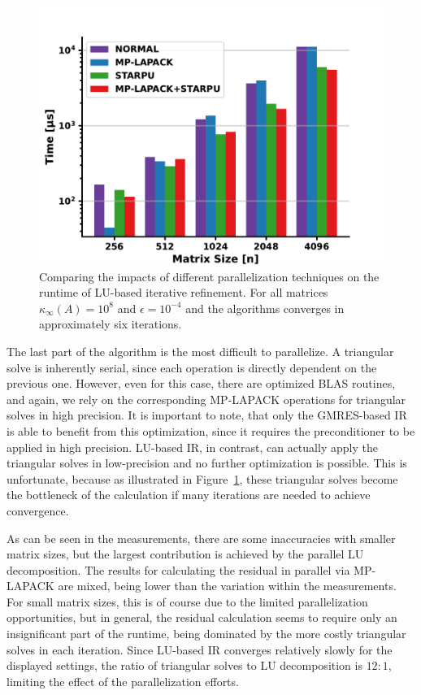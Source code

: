 \begin{figure}[h]
    \centering
    \includegraphics[width=0.8\linewidth]{chapters/5_experiments/figures/LU_parallel.pdf}
    \caption[Parallel LU-based IR]{Comparing the impacts of different parallelization techniques on the runtime of LU-based iterative refinement. For all matrices $\kappa_\infty(A)=10^8$ and $\epsilon=10^{-4}$ and the algorithms converges in approximately six iterations.}
    \label{fig:lu_parallel}
\end{figure}

The last part of the algorithm is the most difficult to parallelize. A triangular solve is inherently serial, since each operation is directly dependent on the previous one. However, even for this case, there are optimized BLAS routines, and again, we rely on the corresponding MP-LAPACK operations for triangular solves in high precision. It is important to note, that only the GMRES-based IR is able to benefit from this optimization, since it requires the preconditioner to be applied in high precision. LU-based IR, in contrast, can actually apply the triangular solves in low-precision and no further optimization is possible. This is unfortunate, because as illustrated in Figure~\hyperref[fig:lu_parallel]{\ref{fig:lu_parallel}}, these triangular solves become the bottleneck of the calculation if many iterations are needed to achieve convergence. 

As can be seen in the measurements, there are some inaccuracies with smaller matrix sizes, but the largest contribution is achieved by the parallel LU decomposition. The results for calculating the residual in parallel via MP-LAPACK are mixed, being lower than the variation within the measurements. For small matrix sizes, this is of course due to the limited parallelization opportunities, but in general, the residual calculation seems to require only an  insignificant part of the runtime, being dominated by the more costly triangular solves in each iteration. Since LU-based IR converges relatively slowly for the displayed settings, the ratio of triangular solves to LU decomposition is $12 : 1$, limiting the effect of the parallelization efforts.

